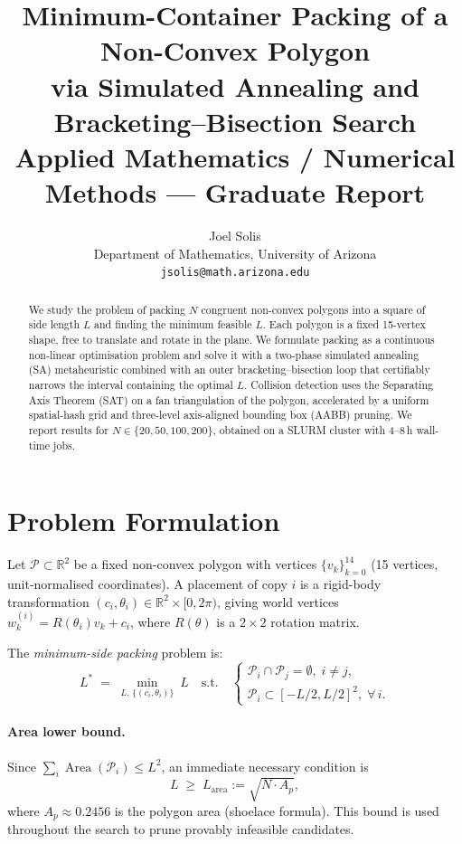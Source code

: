 \documentclass[10pt,twocolumn]{article}
\title{\textbf{Minimum-Container Packing of a Non-Convex Polygon\\
via Simulated Annealing and Bracketing–Bisection Search}\\[4pt]
{\normalsize Applied Mathematics / Numerical Methods — Graduate Report}}
\author{Joel Solis\\
  {\small Department of Mathematics, University of Arizona}\\
  {\small\texttt{jsolis@math.arizona.edu}}}
\date{}
\begin{document}
\maketitle
\thispagestyle{empty}

\begin{abstract}
We study the problem of packing $N$ congruent non-convex polygons into a
square of side length $L$ and finding the minimum feasible $L$.
Each polygon is a fixed 15-vertex shape, free to translate and rotate in
the plane.  We formulate packing as a continuous non-linear optimisation
problem and solve it with a two-phase simulated annealing (SA) metaheuristic
combined with an outer bracketing--bisection loop that certifiably narrows
the interval containing the optimal $L$.  Collision detection uses the
Separating Axis Theorem (SAT) on a fan triangulation of the polygon,
accelerated by a uniform spatial-hash grid and three-level axis-aligned
bounding box (AABB) pruning.  We report results for $N\in\{20,50,100,200\}$,
obtained on a SLURM cluster with 4--8\,h wall-time jobs.
\end{abstract}

\section{Problem Formulation}
\label{sec:problem}

Let $\mathcal{P}\subset\mathbb{R}^{2}$ be a fixed non-convex polygon with
vertices $\{v_k\}_{k=0}^{14}$ (15 vertices, unit-normalised coordinates).
A placement of copy $i$ is a rigid-body transformation
$(c_i,\theta_i)\in\mathbb{R}^{2}\times[0,2\pi)$, giving world vertices
$w_k^{(i)} = R(\theta_i)v_k + c_i$,
where $R(\theta)$ is a $2\times 2$ rotation matrix.

The \emph{minimum-side packing} problem is:
\begin{equation}
  \label{eq:opt}
  L^* \;=\; \min_{L,\,\{(c_i,\theta_i)\}}\ L
  \quad\text{s.t.}\quad
  \begin{cases}
    \mathcal{P}_i \cap \mathcal{P}_j = \emptyset,\; i\neq j,\\
    \mathcal{P}_i \subset [-L/2,L/2]^2,\;\forall\, i.
  \end{cases}
\end{equation}

\paragraph{Area lower bound.}
Since $\sum_i \operatorname{Area}(\mathcal{P}_i)\leq L^2$, an immediate
necessary condition is
\begin{equation}
  \label{eq:area_bound}
  L \;\geq\; L_{\mathrm{area}} := \sqrt{N\cdot A_p},
\end{equation}
where $A_p\approx 0.2456$ is the polygon area (shoelace formula).
This bound is used throughout the search to prune provably infeasible candidates.
\end{document}
